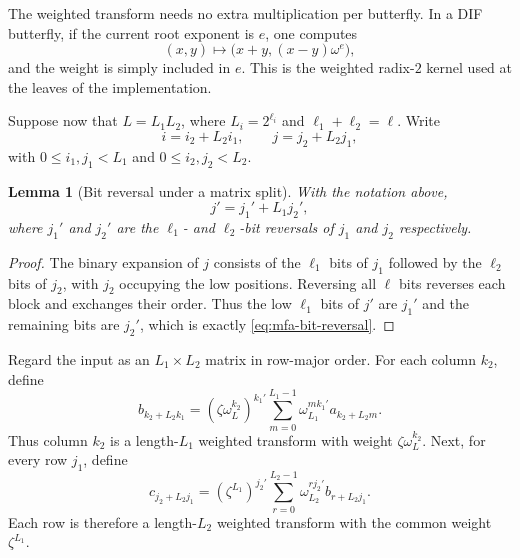 \documentclass[11pt]{book}
\newtheorem{lemma}[theorem]{Lemma}
\theoremstyle{definition}
\begin{document}
The weighted transform needs no extra multiplication per butterfly.  In a DIF
butterfly, if the current root exponent is $e$, one computes
\begin{equation}\label{eq:weighted-dif-butterfly}
 (x,y)\longmapsto
 \bigl(x+y,(x-y)\omega^e\bigr),
\end{equation}
and the weight is simply included in $e$.  This is the weighted radix-$2$
kernel used at the leaves of the implementation.

Suppose now that $L=L_1L_2$, where $L_i=2^{\ell_i}$ and
$\ell_1+\ell_2=\ell$.  Write
\begin{equation}\label{eq:mfa-index-split}
 i=i_2+L_2i_1,
 \qquad
 j=j_2+L_2j_1,
\end{equation}
with $0\leq i_1,j_1<L_1$ and $0\leq i_2,j_2<L_2$.

\begin{lemma}[Bit reversal under a matrix split]\label{lem:mfa-bit-reversal}
With the notation above,
\begin{equation}\label{eq:mfa-bit-reversal}
 j'=j_1'+L_1j_2',
\end{equation}
where $j_1'$ and $j_2'$ are the $\ell_1$- and $\ell_2$-bit reversals of
$j_1$ and $j_2$ respectively.
\end{lemma}

\begin{proof}
The binary expansion of $j$ consists of the $\ell_1$ bits of $j_1$ followed
by the $\ell_2$ bits of $j_2$, with $j_2$ occupying the low positions.
Reversing all $\ell$ bits reverses each block and exchanges their order.
Thus the low $\ell_1$ bits of $j'$ are $j_1'$ and the remaining bits are
$j_2'$, which is exactly \eqref{eq:mfa-bit-reversal}.
\end{proof}

Regard the input as an $L_1\times L_2$ matrix in row-major order.  For each
column $k_2$, define
\begin{equation}\label{eq:mfa-columns}
 b_{k_2+L_2k_1}
 = (\zeta\omega_L^{k_2})^{k_1'}
   \sum_{m=0}^{L_1-1}\omega_{L_1}^{mk_1'}
   a_{k_2+L_2m}.
\end{equation}
Thus column $k_2$ is a length-$L_1$ weighted transform with weight
$\zeta\omega_L^{k_2}$.  Next, for every row $j_1$, define
\begin{equation}\label{eq:mfa-rows}
 c_{j_2+L_2j_1}
 = (\zeta^{L_1})^{j_2'}
   \sum_{r=0}^{L_2-1}\omega_{L_2}^{rj_2'}
   b_{r+L_2j_1}.
\end{equation}
Each row is therefore a length-$L_2$ weighted transform with the common
weight $\zeta^{L_1}$.
\end{document}
